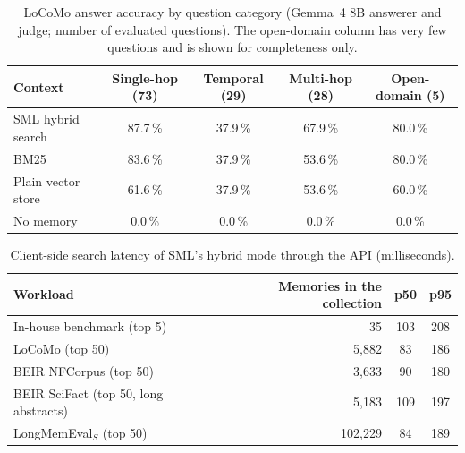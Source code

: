 \documentclass[11pt,a4paper]{article}
\theoremstyle{remark}
\newcommand{\sys}{SML}
\begin{document}
\begin{table}[htbp]
\centering
\small
\caption{LoCoMo answer accuracy by question category (Gemma~4 8B answerer and judge; number of evaluated questions). The
open-domain column has very few questions and is shown for completeness only.}
\label{tab:qacat}
\begin{tabular}{@{}lcccc@{}}
\toprule
Context & Single-hop (73) & Temporal (29) & Multi-hop (28) & Open-domain (5) \\
\midrule
\sys{} hybrid search & 87.7\,\% & 37.9\,\% & 67.9\,\% & 80.0\,\% \\
BM25 & 83.6\,\% & 37.9\,\% & 53.6\,\% & 80.0\,\% \\
Plain vector store & 61.6\,\% & 37.9\,\% & 53.6\,\% & 60.0\,\% \\
No memory & 0.0\,\% & 0.0\,\% & 0.0\,\% & 0.0\,\% \\
\bottomrule
\end{tabular}
\end{table}

\begin{table}[htbp]
\centering
\small
\caption{Client-side search latency of \sys{}'s hybrid mode through the API (milliseconds).}
\label{tab:latency}
\begin{tabular}{@{}lrcc@{}}
\toprule
Workload & Memories in the collection & p50 & p95 \\
\midrule
In-house benchmark (top 5) & 35 & 103 & 208 \\
LoCoMo (top 50) & 5{,}882 & 83 & 186 \\
BEIR NFCorpus (top 50) & 3{,}633 & 90 & 180 \\
BEIR SciFact (top 50, long abstracts) & 5{,}183 & 109 & 197 \\
LongMemEval$_S$ (top 50) & 102{,}229 & 84 & 189 \\
\bottomrule
\end{tabular}
\end{table}
\end{document}
